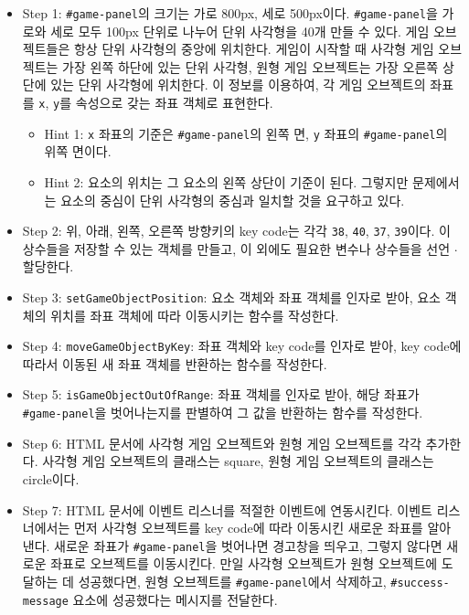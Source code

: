 \begin{itemize}
    \item Step 1: \texttt{\#game-panel}의 크기는 가로 800px, 세로 500px이다. \texttt{\#game-panel}을 가로와 세로 모두 100px 단위로 나누어 단위 사각형을 40개 만들 수 있다. 게임 오브젝트들은 항상 단위 사각형의 중앙에 위치한다. 게임이 시작할 때 사각형 게임 오브젝트는 가장 왼쪽 하단에 있는 단위 사각형, 원형 게임 오브젝트는 가장 오른쪽 상단에 있는 단위 사각형에 위치한다. 이 정보를 이용하여, 각 게임 오브젝트의 좌표를 \texttt{x}, \texttt{y}를 속성으로 갖는 좌표 객체로 표현한다.
    \begin{itemize}
        \item Hint 1: \texttt{x} 좌표의 기준은 \texttt{\#game-panel}의 왼쪽 면, \texttt{y} 좌표의 \texttt{\#game-panel}의 위쪽 면이다.
        \item Hint 2: 요소의 위치는 그 요소의 왼쪽 상단이 기준이 된다. 그렇지만 문제에서는 요소의 중심이 단위 사각형의 중심과 일치할 것을 요구하고 있다.
    \end{itemize}
    \item Step 2: 위, 아래, 왼쪽, 오른쪽 방향키의 key code는 각각 \texttt{38}, \texttt{40}, \texttt{37}, \texttt{39}이다. 이 상수들을 저장할 수 있는 객체를 만들고, 이 외에도 필요한 변수나 상수들을 선언 $\cdot$ 할당한다.
    \item Step 3: \texttt{setGameObjectPosition}: 요소 객체와 좌표 객체를 인자로 받아, 요소 객체의 위치를 좌표 객체에 따라 이동시키는 함수를 작성한다.
    \item Step 4: \texttt{moveGameObjectByKey}: 좌표 객체와 key code를 인자로 받아, key code에 따라서 이동된 새 좌표 객체를 반환하는 함수를 작성한다.
    \item Step 5: \texttt{isGameObjectOutOfRange}: 좌표 객체를 인자로 받아, 해당 좌표가 \texttt{\#game-panel}을 벗어나는지를 판별하여 그 값을 반환하는 함수를 작성한다.
    \item Step 6: HTML 문서에 사각형 게임 오브젝트와 원형 게임 오브젝트를 각각 추가한다. 사각형 게임 오브젝트의 클래스는 square, 원형 게임 오브젝트의 클래스는 circle이다.
    \item Step 7: HTML 문서에 이벤트 리스너를 적절한 이벤트에 연동시킨다. 이벤트 리스너에서는 먼저 사각형 오브젝트를 key code에 따라 이동시킨 새로운 좌표를 알아낸다. 새로운 좌표가 \texttt{\#game-panel}을 벗어나면 경고창을 띄우고, 그렇지 않다면 새로운 좌표로 오브젝트를 이동시킨다. 만일 사각형 오브젝트가 원형 오브젝트에 도달하는 데 성공했다면, 원형 오브젝트를 \texttt{\#game-panel}에서 삭제하고, \texttt{\#success-message} 요소에 성공했다는 메시지를 전달한다.
\end{itemize}
